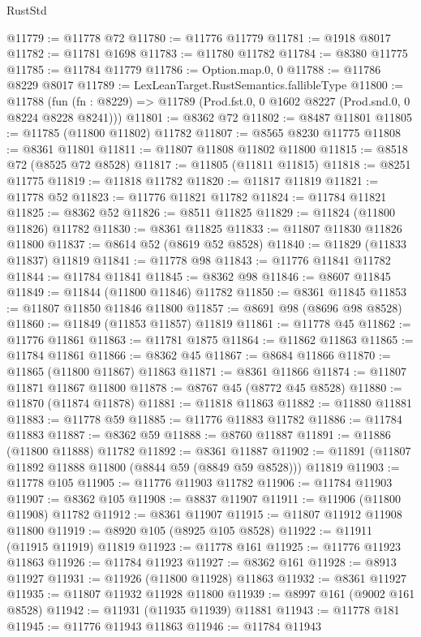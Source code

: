 \begin{lexlean}{RustStd}
\begin{coremodule}
@11779 := @11778 @72
@11780 := @11776 @11779
@11781 := @1918 @8017
@11782 := @11781 @1698
@11783 := @11780 @11782
@11784 := @8380 @11775
@11785 := @11784 @11779
@11786 := Option.map.{0, 0}
@11788 := @11786 @8229 @8017
@11789 := LexLeanTarget.RustSemantics.fallibleType
@11800 := @11788
    (fun (fn : @8229) => @11789 (Prod.fst.{0, 0} @1602 @8227 (Prod.snd.{0, 0} @8224 @8228 @8241)))
@11801 := @8362 @72
@11802 := @8487 @11801
@11805 := @11785 (@11800 @11802) @11782
@11807 := @8565 @8230 @11775
@11808 := @8361 @11801
@11811 := @11807 @11808 @11802 @11800
@11815 := @8518 @72 (@8525 @72 @8528)
@11817 := @11805 (@11811 @11815)
@11818 := @8251 @11775
@11819 := @11818 @11782
@11820 := @11817 @11819
@11821 := @11778 @52
@11823 := @11776 @11821 @11782
@11824 := @11784 @11821
@11825 := @8362 @52
@11826 := @8511 @11825
@11829 := @11824 (@11800 @11826) @11782
@11830 := @8361 @11825
@11833 := @11807 @11830 @11826 @11800
@11837 := @8614 @52 (@8619 @52 @8528)
@11840 := @11829 (@11833 @11837) @11819
@11841 := @11778 @98
@11843 := @11776 @11841 @11782
@11844 := @11784 @11841
@11845 := @8362 @98
@11846 := @8607 @11845
@11849 := @11844 (@11800 @11846) @11782
@11850 := @8361 @11845
@11853 := @11807 @11850 @11846 @11800
@11857 := @8691 @98 (@8696 @98 @8528)
@11860 := @11849 (@11853 @11857) @11819
@11861 := @11778 @45
@11862 := @11776 @11861
@11863 := @11781 @1875
@11864 := @11862 @11863
@11865 := @11784 @11861
@11866 := @8362 @45
@11867 := @8684 @11866
@11870 := @11865 (@11800 @11867) @11863
@11871 := @8361 @11866
@11874 := @11807 @11871 @11867 @11800
@11878 := @8767 @45 (@8772 @45 @8528)
@11880 := @11870 (@11874 @11878)
@11881 := @11818 @11863
@11882 := @11880 @11881
@11883 := @11778 @59
@11885 := @11776 @11883 @11782
@11886 := @11784 @11883
@11887 := @8362 @59
@11888 := @8760 @11887
@11891 := @11886 (@11800 @11888) @11782
@11892 := @8361 @11887
@11902 := @11891 (@11807 @11892 @11888 @11800 (@8844 @59 (@8849 @59 @8528))) @11819
@11903 := @11778 @105
@11905 := @11776 @11903 @11782
@11906 := @11784 @11903
@11907 := @8362 @105
@11908 := @8837 @11907
@11911 := @11906 (@11800 @11908) @11782
@11912 := @8361 @11907
@11915 := @11807 @11912 @11908 @11800
@11919 := @8920 @105 (@8925 @105 @8528)
@11922 := @11911 (@11915 @11919) @11819
@11923 := @11778 @161
@11925 := @11776 @11923 @11863
@11926 := @11784 @11923
@11927 := @8362 @161
@11928 := @8913 @11927
@11931 := @11926 (@11800 @11928) @11863
@11932 := @8361 @11927
@11935 := @11807 @11932 @11928 @11800
@11939 := @8997 @161 (@9002 @161 @8528)
@11942 := @11931 (@11935 @11939) @11881
@11943 := @11778 @181
@11945 := @11776 @11943 @11863
@11946 := @11784 @11943

\end{coremodule}
\end{lexlean}
